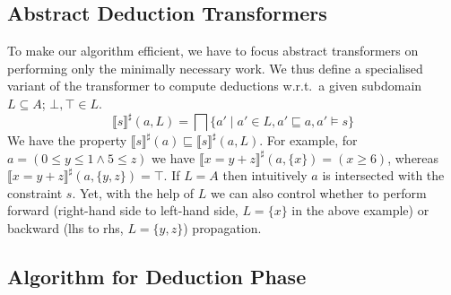 \subsection{Abstract Deduction Transformers} \label{sec:abst}

To make our algorithm efficient, we have to focus abstract
transformers on performing only the minimally necessary
work. 
%
We thus define a specialised variant of the transformer to compute
deductions w.r.t.\ a given subdomain $L\subseteq A$; $\bot,\top \in L$.
\[\llbracket s \rrbracket^\sharp(a,L)=\bigsqcap \{a'\mid a'\in L, a' \sqsubseteq a, a'\models s\}\]
We have the property $\llbracket s \rrbracket^\sharp(a)\sqsubseteq \llbracket s \rrbracket^\sharp(a,L)$.
%
For example, for
$a=(0\leq y \leq 1 \wedge 5\leq z)$ we have
$\llbracket x=y+z\rrbracket^\sharp(a,\{x\})=(x\geq 6)$, whereas
$\llbracket x=y+z\rrbracket^\sharp(a,\{y,z\})=\top$.
%
If $L=A$ then intuitively $a$ is intersected with the constraint $s$.
Yet, with the help of $L$ we can also control whether to perform
forward (right-hand side to left-hand side, $L=\{x\}$ in the above
example) or backward (lhs to rhs, $L=\{y,z\}$) propagation.





\subsection{Algorithm for Deduction Phase}
%


